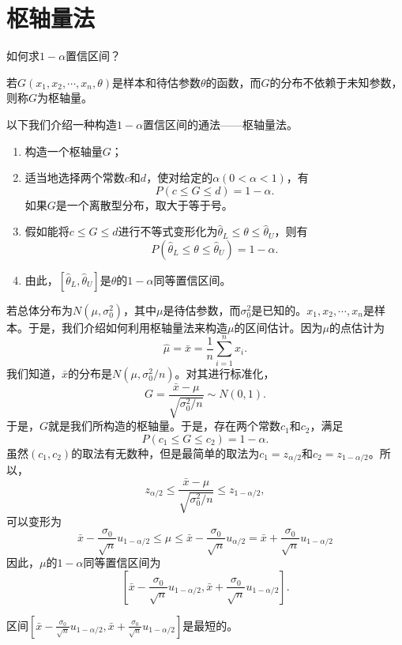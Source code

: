 \section{枢轴量法}
\begin{problem}
    如何求$1-\alpha$置信区间？
\end{problem}
\begin{definition}[枢轴量]
    若$G(x_1,x_2,\cdots,x_n,\theta)$是样本和待估参数$\theta$的函数，而$G$的分布不依赖于未知参数，则称$G$为枢轴量。
\end{definition}
以下我们介绍一种构造$1-\alpha$置信区间的通法——枢轴量法。
\begin{enumerate}
    \item 构造一个枢轴量$G$；
    \item 适当地选择两个常数$c$和$d$，使对给定的$\alpha(0<\alpha<1)$，有
    $$
    P(c\leq G\leq d) = 1-\alpha.
    $$
    如果$G$是一个离散型分布，取大于等于号。
    \item 假如能将$c\leq G\leq d$进行不等式变形化为$\hat{\theta}_L\leq \theta\leq \hat{\theta}_U$，则有
    $$
    P(\hat{\theta}_L\leq \theta\leq \hat{\theta}_U) = 1-\alpha.
    $$
    \item 由此，$\left[\hat{\theta}_L,\hat{\theta}_U\right]$是$\theta$的$1-\alpha $同等置信区间。
\end{enumerate}

\begin{example}
    若总体分布为$N(\mu,\sigma_0^2)$，其中$\mu$是待估参数，而$\sigma_0^2$是已知的。$x_1,x_2,\cdots,x_n$是样本。于是，我们介绍如何利用枢轴量法来构造$\mu$的区间估计。因为$\mu$的点估计为$$\hat{\mu} = \bar{x} = \frac{1}{n}\sum_{i=1}^n x_i.$$
    我们知道，$\bar{x}$的分布是$N(\mu,\sigma_0^2/n)$。对其进行标准化，
    $$
    G = \frac{\bar{x}-\mu}{\sqrt{\sigma_0^2/n}} \sim N(0,1).
    $$
    于是，$G$就是我们所构造的枢轴量。于是，存在两个常数$c_1$和$c_2$，满足
    $$
    P(c_1\leq G\leq c_2) = 1-\alpha.
    $$
    虽然$(c_1,c_2)$的取法有无数种，但是最简单的取法为$c_1= z_{\alpha/2}$和$c_2 = z_{1-\alpha/2}$。所以，
$$
z_{\alpha/2} \leq \frac{\bar{x}-\mu}{\sqrt{\sigma_0^2/n}}\leq z_{1-\alpha/2},
$$
可以变形为
$$
\bar{x}- \frac{\sigma_0}{\sqrt{n}}u_{1-\alpha/2} \leq \mu \leq \bar{x}- \frac{\sigma_0}{\sqrt{n}}u_{\alpha/2} = \bar{x} + \frac{\sigma_0}{\sqrt{n}}u_{1-\alpha/2}
$$
因此，$\mu$的$1-\alpha$同等置信区间为
$$
\left[\bar{x}- \frac{\sigma_0}{\sqrt{n}}u_{1-\alpha/2},\bar{x} + \frac{\sigma_0}{\sqrt{n}}u_{1-\alpha/2}  \right].
$$
\end{example}
\begin{remark}
    区间$\left[\bar{x}- \frac{\sigma_0}{\sqrt{n}}u_{1-\alpha/2},\bar{x} + \frac{\sigma_0}{\sqrt{n}}u_{1-\alpha/2}  \right]$是最短的。
\end{remark}



